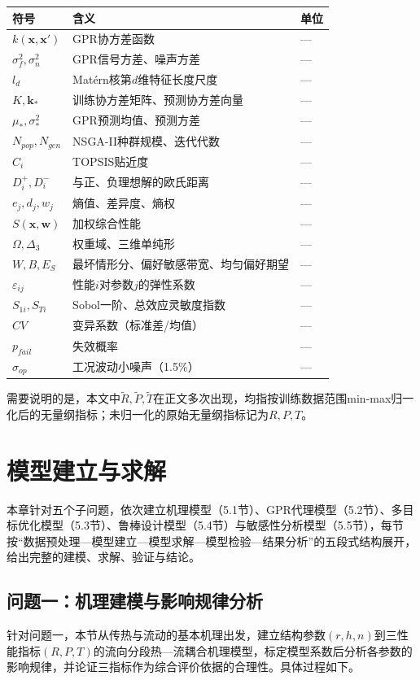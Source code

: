 \documentclass[withoutpreface]{cumcmthesis}
\begin{document}
\begin{table}[htbp]
\centering
\small
\begin{tabularx}{\textwidth}{XXX}
\toprule
符号 & 含义 & 单位 \\
\midrule
$k(\mathbf{x},\mathbf{x}')$ & GPR协方差函数 & — \\
$\sigma_f^2,\sigma_n^2$ & GPR信号方差、噪声方差 & — \\
$l_d$ & Matérn核第$d$维特征长度尺度 & — \\
$K,\mathbf{k}_*$ & 训练协方差矩阵、预测协方差向量 & — \\
$\mu_*,\sigma_*^2$ & GPR预测均值、预测方差 & — \\
$N_{pop},N_{gen}$ & NSGA-II种群规模、迭代代数 & — \\
$C_i$ & TOPSIS贴近度 & — \\
$D_i^+,D_i^-$ & 与正、负理想解的欧氏距离 & — \\
$e_j,d_j,w_j$ & 熵值、差异度、熵权 & — \\
$S(\mathbf{x},\mathbf{w})$ & 加权综合性能 & — \\
$\Omega,\Delta_3$ & 权重域、三维单纯形 & — \\
$W,B,E_S$ & 最坏情形分、偏好敏感带宽、均匀偏好期望 & — \\
$\varepsilon_{ij}$ & 性能$i$对参数$j$的弹性系数 & — \\
$S_{1i},S_{Ti}$ & Sobol一阶、总效应灵敏度指数 & — \\
$CV$ & 变异系数（标准差/均值） & — \\
$p_{fail}$ & 失效概率 & — \\
$\sigma_{op}$ & 工况波动小噪声（1.5\%） & — \\
\bottomrule
\end{tabularx}
\end{table}
需要说明的是，本文中$\tilde{R},\tilde{P},\tilde{T}$在正文多次出现，均指按训练数据范围min-max归一化后的无量纲指标；未归一化的原始无量纲指标记为$R,P,T$。

\section{模型建立与求解}
本章针对五个子问题，依次建立机理模型（5.1节）、GPR代理模型（5.2节）、多目标优化模型（5.3节）、鲁棒设计模型（5.4节）与敏感性分析模型（5.5节），每节按“数据预处理—模型建立—模型求解—模型检验—结果分析”的五段式结构展开，给出完整的建模、求解、验证与结论。

\subsection{问题一：机理建模与影响规律分析}
针对问题一，本节从传热与流动的基本机理出发，建立结构参数$(r,h,n)$到三性能指标$(R,P,T)$的流向分段热—流耦合机理模型，标定模型系数后分析各参数的影响规律，并论证三指标作为综合评价依据的合理性。具体过程如下。
\end{document}
